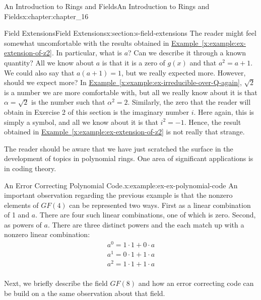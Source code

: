 \documentclass[oneside,10pt,]{book}
\newcommand{\xreffont}{\relax}
\numberwithin{equation}{section}
\begin{document}
\begin{chapterptx}{An Introduction to Rings and Fields}{}{An Introduction to Rings and Fields}{}{}{x:chapter:chapter_16}
\begin{sectionptx}{Field Extensions}{}{Field Extensions}{}{}{x:section:s-field-extensions}
The reader might feel somewhat uncomfortable with the results obtained in \hyperref[x:example:ex-extension-of-z2]{Example~{\xreffont\ref{x:example:ex-extension-of-z2}}}. In particular, what is \(a\)? Can we describe it through a known quantity? All we know about \(a\) is that it is a zero of \(g(x)\) and that \(a^2= a + 1\). We could also say that \(a(a + 1) = 1\), but we really expected more. However, should we expect more? In \hyperref[x:example:ex-irreducible-over-Q-again]{Example~{\xreffont\ref{x:example:ex-irreducible-over-Q-again}}}, \(\sqrt{2}\) is a number we are more comfortable with, but all we really know about it is that \(\alpha =\sqrt{2}\) is the number such that \(\alpha ^2= 2\). Similarly, the zero that the reader will obtain in Exercise 2 of this section is the imaginary number \(i\). Here again, this is simply a symbol, and all we know about it is that \(i^2=-1\). Hence, the result obtained in \hyperref[x:example:ex-extension-of-z2]{Example~{\xreffont\ref{x:example:ex-extension-of-z2}}} is not really that strange.%
\par
The reader should be aware that we have just scratched the surface in the development of topics in polynomial rings. One area of significant applications is in coding theory.%
\begin{example}{An Error Correcting Polynomial Code.}{x:example:ex-ex-polynomial-code}%
%
%
An important observation regarding the previous example is that the nonzero elements of \(GF(4)\) can be represented two ways.  First as a linear combination of 1 and \(a\).   There are four such linear combinations, one of which is zero.  Second, as powers of \(a\).  There are three distinct powers and the each match up with a nonzero linear combination:%
\begin{equation*}
\begin{array}{c}
a^0 = 1\cdot 1 + 0 \cdot a\\
a^1 = 0\cdot 1 + 1 \cdot a\\
a^2 = 1\cdot 1 + 1 \cdot a\\
\end{array}
\end{equation*}
%
\par
Next, we briefly describe the field \(GF(8)\) and how an error correcting code can be build on a the same observation about that field.%
\par

\end{example}
\end{sectionptx}
\end{chapterptx}
\end{document}
